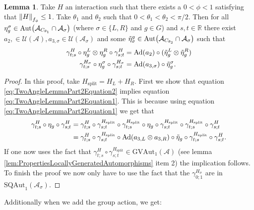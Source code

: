 \documentclass[12pt,a4paper,twoside]{article}
\let\originalleft\left
\let\originalright\right
\renewcommand{\left}{\mathopen{}\mathclose\bgroup\originalleft}
\renewcommand{\right}{\aftergroup\egroup\originalright}
\newcommand{\UU}{\mathcal U}
\renewcommand{\AA}{\mathcal A}
\newcommand{\RR}{\mathbb R}
\newcommand{\Ad}[1]{\textrm{Ad}\left(#1\right)}
\newcommand{\Aut}[1]{\textrm{Aut}\left(#1\right)}
\theoremstyle{definition}
\newtheorem{lemma}[theorem]{Lemma}
\numberwithin{equation}{section}
\begin{document}
\begin{lemma}\label{lem:TwoAngleLemmaPart2}
	Take $H$ an interaction such that there exists a $0<\phi<1$ satisfying that $\norm{H}_{f_\phi}\leq 1$. Take $\theta_1$ and $\theta_2$ such that $0<\theta_1<\theta_2<\pi/2$. Then for all $\eta_{g}^{\sigma}\in\Aut{\AA_{C_{\theta_1}}\cap\AA_{\sigma}}$ (where $\sigma\in\{L,R\}$ and $g\in G$) and $s,t\in\RR$ there exist $a_{2},\in\UU(\AA),a_{3,\sigma}\in\UU(\AA_\sigma)$ and some $\tilde{\eta}_{\sigma}^g\in \Aut{\AA_{C_{\theta_2}}\cap\AA_{\sigma}}$ such that
	\begin{align}
		\label{eq:TwoAngleLemmaPart2Equation1}
		\gamma^{H}_{t;s}\circ\eta_{g}^L\otimes\eta_{g}^R\circ\gamma^{H}_{s;t}&=\Ad{a_2}\circ(\tilde\eta_{g}^L \otimes\tilde\eta_{g}^R)\\
		\label{eq:TwoAngleLemmaPart2Equation2}
		\gamma^{H_\sigma}_{t;s}\circ\eta_g^\sigma\circ\gamma^{H_\sigma}_{s;t}&=\Ad{a_{3,\sigma}}\circ \tilde\eta_{g}^\sigma.
	\end{align}
\end{lemma}
\begin{proof}
	In this proof, take $H_{\text{split}}=H_L+H_R$. First we show that equation \eqref{eq:TwoAngleLemmaPart2Equation2} implies equation \eqref{eq:TwoAngleLemmaPart2Equation1}. This is because using equation \eqref{eq:TwoAngleLemmaPart2Equation1} we get that
	\begin{align}
		\gamma^H_{t;s}\circ\eta_g\circ\gamma^{H}_{s;t}&=\gamma^H_{t;s}\circ\gamma^{H_{\text{split}}}_{s;t}\circ\gamma^{H_{\text{split}}}_{t;s}\circ\eta_g\circ\gamma^{H_{\text{split}}}_{s;t}\circ\gamma^{H_{\text{split}}}_{t;s}\circ\gamma^H_{s;t}\\
		&=\gamma^H_{t;s}\circ\gamma^{H_{\text{split}}}_{s;t}\circ\Ad{a_{3,L}\otimes a_{3,R}}\circ\tilde{\eta}_g\circ\gamma^{H_{\text{split}}}_{t;s}\circ\gamma^H_{s;t}.
	\end{align}
	If one now uses the fact that $\gamma^H_{t;s}\circ\gamma^{H_{\text{split}}}_{s;t}\in\textrm{GVAut}_1(\AA)$ (see lemma \ref{lem:PropertiesLocallyGeneratedAutomorphisms} item 2) the implication follows. To finish the proof we now only have to use the fact that the $\gamma^{H_\sigma}_{0;1}$ are in $\textrm{SQAut}_1(\AA_\sigma)$.
\end{proof}
Additionally when we add the group action, we get:
\end{document}
